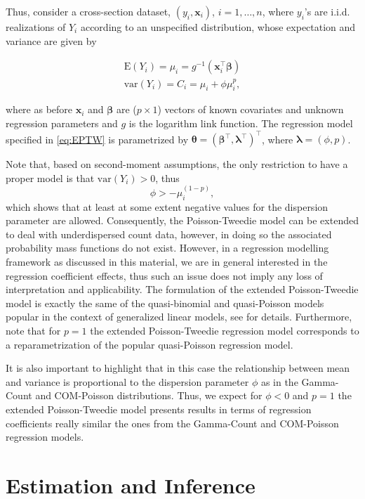 \documentclass[9pt,a5paper,]{book}
\theoremstyle{definition}
\theoremstyle{definition}
\theoremstyle{remark}
\begin{document}
Thus, consider a cross-section dataset, \((y_i, \boldsymbol{x}_i)\),
\(i = 1, \ldots, n\), where \(y_i\)'s are i.i.d. realizations of \(Y_i\)
according to an unspecified distribution, whose expectation and variance
are given by

\begin{align}
\mathrm{E}(Y_i) = \mu_i = g^{-1}(\boldsymbol{x}_i^{\top} \boldsymbol{\beta}) \nonumber \\
\mathrm{var}(Y_i) = C_i = \mu_i + \phi \mu_i^p,
\label{eq:EPTW}
\end{align}

where as before \(\boldsymbol{x}_i\) and \(\boldsymbol{\beta}\) are
(\(p \times 1\)) vectors of known covariates and unknown regression
parameters and \(g\) is the logarithm link function. The regression
model specified in \eqref{eq:EPTW} is parametrized by
\(\boldsymbol{\theta} = (\boldsymbol{\beta}^\top, \boldsymbol{\lambda}^\top )^\top\),
where \(\boldsymbol{\lambda} = (\phi, p)\).

Note that, based on second-moment assumptions, the only restriction to
have a proper model is that \(\mathrm{var}(Y_i) > 0\), thus
\[\phi > - \mu^{(1-p)}_i,\] which shows that at least at some extent
negative values for the dispersion parameter are allowed. Consequently,
the Poisson-Tweedie model can be extended to deal with underdispersed
count data, however, in doing so the associated probability mass
functions do not exist. However, in a regression modelling framework as
discussed in this material, we are in general interested in the
regression coefficient effects, thus such an issue does not imply any
loss of interpretation and applicability. The formulation of the
extended Poisson-Tweedie model is exactly the same of the quasi-binomial
and quasi-Poisson models popular in the context of generalized linear
models, see \citep[\citet{Nelder1972}]{Wedderburn1974} for details.
Furthermore, note that for \(p = 1\) the extended Poisson-Tweedie
regression model corresponds to a reparametrization of the popular
quasi-Poisson regression model.

It is also important to highlight that in this case the relationship
between mean and variance is proportional to the dispersion parameter
\(\phi\) as in the Gamma-Count and COM-Poisson distributions. Thus, we
expect for \(\phi < 0\) and \(p = 1\) the extended Poisson-Tweedie model
presents results in terms of regression coefficients really similar the
ones from the Gamma-Count and COM-Poisson regression models.

\section{Estimation and Inference}\label{estimation-and-inference}
\end{document}
